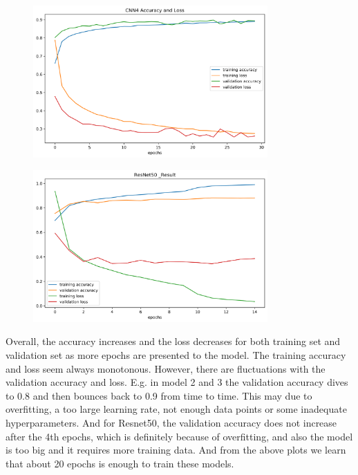 \documentclass[12pt]{article}
\begin{document}
\begin{figure}[H]
\begin{center}
    \includegraphics[width=0.8\textwidth]{../plots/CNN4_Result.png}
\end{center}
\end{figure}
\begin{figure}[H]
\begin{center}
    \includegraphics[width=0.8\textwidth]{../plots/Resnet50_Result.png}
\end{center}
\end{figure}
\vspace*{-1.0cm}

Overall, the accuracy increases and the loss decreases for both training set and validation set as more epochs are presented to the model. The training accuracy and loss seem always monotonous. However, there are fluctuations with the validation accuracy and loss. E.g. in model 2 and 3 the validation accuracy dives to 0.8 and then bounces back to 0.9 from time to time. This may due to overfitting, a too large learning rate, not enough data points or some inadequate hyperparameters. And for Resnet50, the validation accuracy does not increase after the 4th epochs, which is definitely because of overfitting, and also the model is too big and it requires more training data. And from the above plots we learn that about 20 epochs is enough to train these models.
\end{document}
